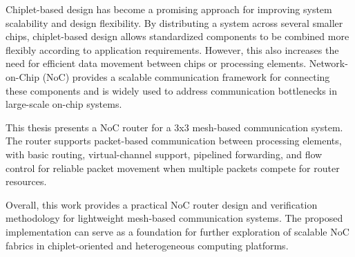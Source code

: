 Chiplet-based design has become a promising approach for improving system scalability and design flexibility. By distributing a system across several smaller chips, chiplet-based design allows standardized components to be combined more flexibly according to application requirements. However, this also increases the need for efficient data movement between chips or processing elements. Network-on-Chip (NoC) provides a scalable communication framework for connecting these components and is widely used to address communication bottlenecks in large-scale on-chip systems.

This thesis presents a NoC router for a 3x3 mesh-based communication system. The router supports packet-based communication between processing elements, with basic routing, virtual-channel support, pipelined forwarding, and flow control for reliable packet movement when multiple packets compete for router resources.

Overall, this work provides a practical NoC router design and verification methodology for lightweight mesh-based communication systems. The proposed implementation can serve as a foundation for further exploration of scalable NoC fabrics in chiplet-oriented and heterogeneous computing platforms.
